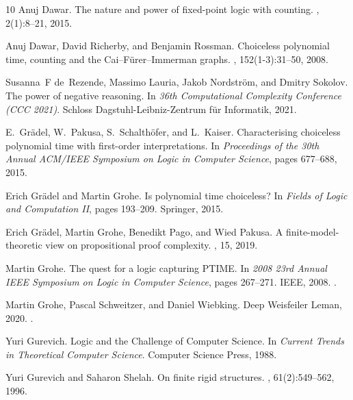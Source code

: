 \documentclass[10pt,a4paper]{article}
\begin{document}
\begin{thebibliography}{10}
Anuj Dawar.
\newblock The nature and power of fixed-point logic with counting.
, 2(1):8--21, 2015.

Anuj Dawar, David Richerby, and Benjamin Rossman.
\newblock Choiceless polynomial time, counting and the
  {C}ai--{F}{\"u}rer--{I}mmerman graphs.
, 152(1-3):31--50, 2008.

Susanna~F de~Rezende, Massimo Lauria, Jakob Nordstr{\"o}m, and Dmitry Sokolov.
\newblock The power of negative reasoning.
\newblock In {\em 36th Computational Complexity Conference (CCC 2021)}. Schloss
  Dagstuhl-Leibniz-Zentrum f{\"u}r Informatik, 2021.

E.~Gr{\"{a}}del, W.~Pakusa, S.~Schalth{\"{o}}fer, and L.~Kaiser.
\newblock Characterising choiceless polynomial time with first-order
  interpretations.
\newblock In {\em Proceedings of the 30th Annual {ACM/IEEE} Symposium on Logic
  in Computer Science}, pages 677--688, 2015.

Erich Gr{\"a}del and Martin Grohe.
\newblock Is polynomial time choiceless?
\newblock In {\em Fields of Logic and Computation II}, pages 193--209.
  Springer, 2015.

Erich Gr{\"a}del, Martin Grohe, Benedikt Pago, and Wied Pakusa.
\newblock A finite-model-theoretic view on propositional proof complexity.
, 15, 2019.

Martin Grohe.
\newblock The quest for a logic capturing {PTIME}.
\newblock In {\em 2008 23rd Annual IEEE Symposium on Logic in Computer
  Science}, pages 267--271. IEEE, 2008.
\newblock \href {https://doi.org/10.1109/LICS.2008.11}
  {}.

Martin Grohe, Pascal Schweitzer, and Daniel Wiebking.
\newblock Deep {W}eisfeiler {L}eman, 2020.
\newblock \href {http://arxiv.org/abs/2003.10935} {}.

Yuri Gurevich.
\newblock Logic and the {C}hallenge of {C}omputer {S}cience.
\newblock In {\em Current Trends in Theoretical Computer Science}. Computer
  Science Press, 1988.

Yuri Gurevich and Saharon Shelah.
\newblock On finite rigid structures.
, 61(2):549--562, 1996.


\end{thebibliography}
\end{document}

